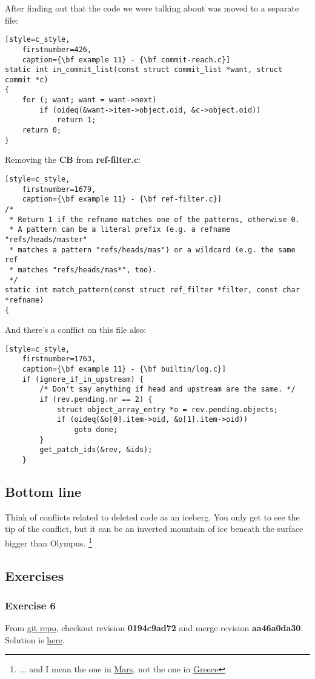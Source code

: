 After finding out that the code we were talking about was moved to a separate file:
\begin{lstlisting}[style=c_style,
	firstnumber=426,
	caption={\bf example 11} - {\bf commit-reach.c}]
static int in_commit_list(const struct commit_list *want, struct commit *c)
{
	for (; want; want = want->next)
		if (oideq(&want->item->object.oid, &c->object.oid))
			return 1;
	return 0;
}
\end{lstlisting}

Removing the {\bf CB} from {\bf ref-filter.c}:
\begin{lstlisting}[style=c_style,
	firstnumber=1679,
	caption={\bf example 11} - {\bf ref-filter.c}]
/*
 * Return 1 if the refname matches one of the patterns, otherwise 0.
 * A pattern can be a literal prefix (e.g. a refname "refs/heads/master"
 * matches a pattern "refs/heads/mas") or a wildcard (e.g. the same ref
 * matches "refs/heads/mas*", too).
 */
static int match_pattern(const struct ref_filter *filter, const char *refname)
{
\end{lstlisting}

And there's a conflict on this file also:
\begin{lstlisting}[style=c_style,
	firstnumber=1763,
	caption={\bf example 11} - {\bf builtin/log.c}]
	if (ignore_if_in_upstream) {
		/* Don't say anything if head and upstream are the same. */
		if (rev.pending.nr == 2) {
			struct object_array_entry *o = rev.pending.objects;
			if (oideq(&o[0].item->oid, &o[1].item->oid))
				goto done;
		}
		get_patch_ids(&rev, &ids);
	}
\end{lstlisting}

\subsection{Bottom line}
Think of conflicts related to deleted code as an iceberg. You only get to see the tip of the conflict, but it can be an
inverted mountain of ice beneath the surface bigger than Olympus.
\footnote{... and I mean the one in \href{https://en.wikipedia.org/wiki/Olympus_Mons}{Mars}, not the one in
\href{https://en.wikipedia.org/wiki/Mount_Olympus}{Greece}}

\subsection{Exercises}
\subsubsection{Exercise 6}
From \hyperref[git_repo]{git repo}, checkout revision {\bf 0194c9ad72} and merge revision {\bf aa46a0da30}. Solution is
\hyperref[exercise_06]{here}.
